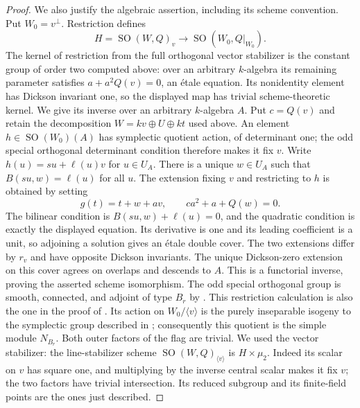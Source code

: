 \begin{proof}
We also justify the algebraic assertion, including its scheme
convention.  Put $W_0=v^\perp$.  Restriction defines
\[
 H=\operatorname{SO}(W,Q)_v\longrightarrow
       \operatorname{SO}(W_0,Q|_{W_0}).
\]
The kernel of restriction from the full orthogonal vector stabilizer
is the constant group of order two computed above: over an arbitrary
$k$-algebra its remaining parameter satisfies $a+a^2Q(v)=0$, an
\'{e}tale equation.  Its nonidentity element has Dickson invariant one,
so the displayed map has trivial scheme-theoretic kernel.
We give its inverse over an arbitrary $k$-algebra $A$.
Put $c=Q(v)$ and retain the decomposition
$W=kv\oplus U\oplus kt$ used above.  An element
$h\in\operatorname{SO}(W_0)(A)$ has symplectic quotient action, of
determinant one; the odd special orthogonal determinant condition
therefore makes it fix $v$.  Write
$h(u)=su+\ell(u)v$ for $u\in U_A$.  There is a unique $w\in U_A$
such that $B(su,w)=\ell(u)$ for all $u$.  The extension fixing $v$
and restricting to $h$ is obtained by setting
\[
 g(t)=t+w+av,\qquad ca^2+a+Q(w)=0.
\]
The bilinear condition is $B(su,w)+\ell(u)=0$, and the quadratic
condition is exactly the displayed equation.  Its derivative is one
and its leading coefficient is a unit, so adjoining a solution gives
an \'{e}tale double cover.  The two extensions differ by $r_v$ and
have opposite Dickson invariants.  The unique Dickson-zero extension
on this cover agrees on overlaps and descends to $A$.  This is a
functorial inverse, proving the asserted scheme isomorphism.
The odd special orthogonal group is smooth, connected,
and adjoint of type $B_r$ by
\cite[author version, Theorem~C.2.11 and Proposition~C.3.10]{Conrad2014}.
This restriction calculation is also the one in the proof of
\cite[author version, Proposition~C.3.1]{Conrad2014}.
Its action on $W_0/\langle v\rangle$ is the purely inseparable
isogeny to the symplectic group described in
\cite[author version, Remark~C.3.6]{Conrad2014}; consequently this
quotient is the simple module $N_{B_r}$.  Both outer factors of the
flag are trivial.  We used the vector stabilizer: the line-stabilizer
scheme $\operatorname{SO}(W,Q)_{\langle v\rangle}$ is
$H\times\mu_2$.  Indeed its scalar on $v$ has square one,
and multiplying by the inverse central scalar makes it fix $v$;
the two factors have trivial intersection.  Its reduced subgroup
and its finite-field points are the ones just described.
\end{proof}

